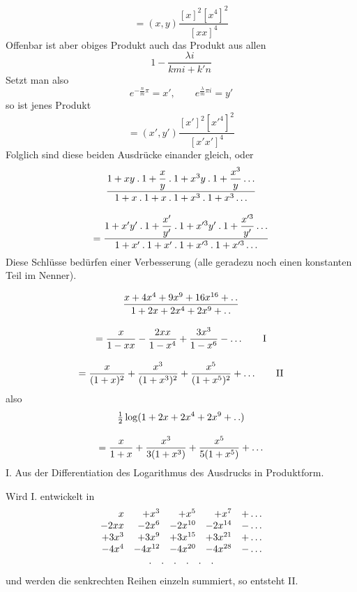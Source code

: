 \[
=(x,y)\frac{[x]^2[x^4]^2}{[xx]^4}
\]
\noindent Offenbar ist aber obiges Produkt auch das Produkt aus allen
\[
1-\frac{\lambda i}{kmi+k'n}
\]
Setzt man also
\[
e^{-\frac nm\pi}=x',\qquad e^{\frac\lambda m\pi i}=y'
\]
so ist jenes Produkt
\[
=(x',y')\frac{[x']^2[x'^4]^2}{[x'x']^4}
\]
Folglich sind diese beiden Ausdrücke einander gleich, oder
\[
\begin{gathered}\frac{1+xy\mathbin{.}1+\dfrac xy\mathbin{.}1+x^3y\mathbin{.}1+\dfrac{x^3}y\mathinner{.\,.\,.}}
 {1+x\mathbin{.}1+x\mathbin{.}1+x^3\mathbin{.}1+x^3\mathinner{.\,.\,.}}\\[9pt]=
\frac{1+x'y'\mathbin{.}1+\dfrac{x'}{y'}\mathbin{.}1+x'^3y'\mathbin{.}1+\dfrac{x'^3}{y'}\mathinner{.\,.\,.}}
 {1+x'\mathbin{.}1+x'\mathbin{.}1+x'^3\mathbin{.}1+x'^3\mathinner{.\,.\,.}}\end{gathered}
\]
Diese Schlüsse bedürfen einer Verbesserung (alle geradezu noch einen konstanten Teil im Nenner).


\[
\begin{gathered}
\frac{x+4x^4+9x^9+16x^{16}+\mathinner{.\,.}}{1+2x+2x^4+2x^9+\mathinner{.\,.}}
\\[9pt]=\frac{x}{1-xx}-\frac{2xx}{1-x^4}+\frac{3x^3}{1-x^6}-\mathinner{.\,.\,.}
\qquad \mathrm{I}\\[9pt]=\frac{x}{(1+x)^2}+\frac{x^3}{(1+x^3)^2}+\frac{x^5}{(1+x^5)^2}+\mathinner{.\,.\,.}
\qquad \mathrm{II}
\end{gathered}
\]
also
\[
\begin{gathered}\tfrac12\log(1+2x+2x^4+2x^9+\mathinner{.\,.})\\[9pt]=\frac{x}{1+x}+\frac{x^3}{3(1+x^3)}+\frac{x^5}{5(1+x^5)}+\mathinner{.\,.\,.}\end{gathered}
\]
I. Aus der Differentiation des Logarithmus des Ausdrucks in Produktform.

Wird I. entwickelt in
\[
\begin{array}{rrrrl}
x&+x^3&+x^5&+x^7&+\mathinner{.\,.\,.}\\
-2xx&-2x^6&-2x^{10}&-2x^{14}&-\mathinner{.\,.\,.}\\
+3x^3&+3x^9&+3x^{15}&+3x^{21}&+\mathinner{.\,.\,.}\\
-4x^4&-4x^{12}&-4x^{20}&-4x^{28}&-\mathinner{.\,.\,.}\\
\multicolumn{5}{c}{.\quad .\quad .\quad .\quad .\quad .}
\end{array}
\]
und werden die senkrechten Reihen einzeln summiert, so entsteht II.


